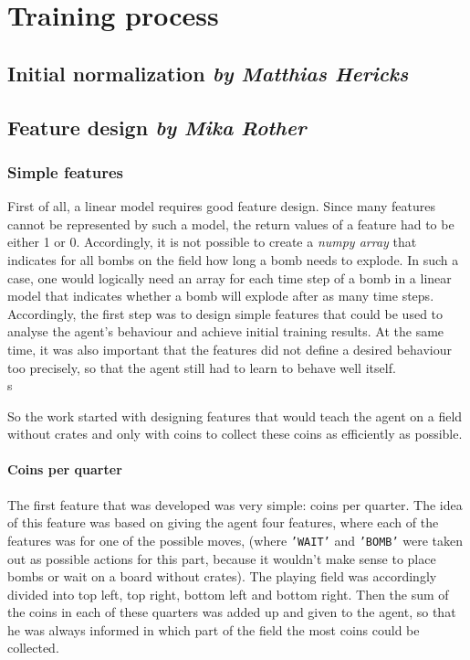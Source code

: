 \chapter{Training process}

\section[Initial normalization]{Initial normalization \hfill \small \normalfont\textit{by Matthias Hericks}}



\section[Feature design]{Feature design \hfill \small \normalfont\textit{by Mika Rother}}
\subsection{Simple features}
First of all, a linear model requires good feature design. Since many features cannot be represented by such a model, the return values of a feature had to be either 1 or 0. Accordingly, it is not possible to create a \textit{numpy array} that indicates for all bombs on the field how long a bomb needs to explode. In such a case, one would logically need an array for each time step of a bomb in a linear model that indicates whether a bomb will explode after as many time steps.
\\

Accordingly, the first step was to design simple features that could be used to analyse the agent's behaviour and achieve initial training results. At the same time, it was also important that the features did not define a desired behaviour too precisely, so that the agent still had to learn to behave well itself. 
\\s

So the work started with designing features that would teach the agent on a field without crates and only with coins to collect these coins as efficiently as possible.

\subsubsection*{Coins per quarter}
The first feature that was developed was very simple: coins per quarter. The idea of this feature was based on giving the agent four features, where each of the features was for one of the possible moves, (where \texttt{'WAIT'} and \texttt{'BOMB'} were taken out as possible actions for this part, because it wouldn't make sense to place bombs or wait on a board without crates). The playing field was accordingly divided into top left, top right, bottom left and bottom right. Then the sum of the coins in each of these quarters was added up and given to the agent, so that he was always informed in which part of the field the most coins could be collected. 
\\

